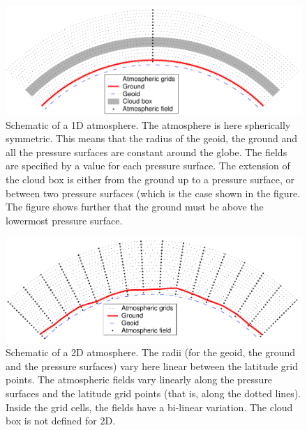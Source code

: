 \begin{figure}[!t]
 \begin{center}
  \includegraphics*[width=0.98\hsize]{Figs/fm_definitions/atm_dim_1d}
  \caption{Schematic of a 1D atmosphere. The atmosphere is 
    here spherically symmetric. This means that the radius of the
    geoid, the ground and all the pressure surfaces are constant
    around the globe. The fields are specified by a value for each
    pressure surface. The extension of the cloud box is either from
    the ground up to a pressure surface, or between two pressure
    surfaces (which is the case shown in the figure. The figure shows
    further that the ground must be above the lowermost pressure
    surface. }
  \label{fig:fm_defs:1d}  
 \end{center}
\end{figure}

\begin{figure}[!t]
 \begin{center}
  \includegraphics*[width=0.98\hsize]{Figs/fm_definitions/atm_dim_2d}
  \caption{Schematic of a 2D atmosphere. The radii (for the geoid, the ground
    and the pressure surfaces) vary here linear between the latitude
    grid points. The atmospheric fields vary linearly along the
    pressure surfaces and the latitude grid points (that is, along the
    dotted lines). Inside the grid cells, the fields have a bi-linear
    variation. The cloud box is not defined for 2D.  }
  \label{fig:fm_defs:2d}
 \end{center}
\end{figure}

